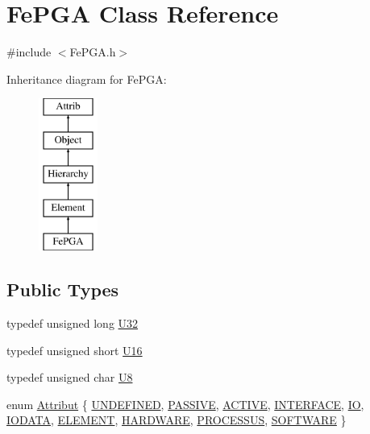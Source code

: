 \hypertarget{classFePGA}{}\section{Fe\+P\+GA Class Reference}
\label{classFePGA}


{\ttfamily \#include $<$Fe\+P\+G\+A.\+h$>$}

Inheritance diagram for Fe\+P\+GA\+:\begin{figure}[H]
\begin{center}
\leavevmode
\includegraphics[height=5.000000cm]{classFePGA}
\end{center}
\end{figure}
\subsection*{Public Types}
\begin{DoxyCompactItemize}
\item 
typedef unsigned long \hyperlink{classFePGA_a1d44a0b27d13179bb1dceb5ec6f4cc1f}{U32}
\item 
typedef unsigned short \hyperlink{classFePGA_ac84b20a342a6c963cba061c8bdc37651}{U16}
\item 
typedef unsigned char \hyperlink{classFePGA_ab65d84dbbc4b5711eb4d85d00c5abfa2}{U8}
\item 
enum \hyperlink{classAttrib_a69e171d7cc6417835a5a306d3c764235}{Attribut} \{ \newline
\hyperlink{classAttrib_a69e171d7cc6417835a5a306d3c764235a3a8da2ab97dda18aebab196fe4100531}{U\+N\+D\+E\+F\+I\+N\+ED}, 
\hyperlink{classAttrib_a69e171d7cc6417835a5a306d3c764235a2bfb2af57b87031d190a05fe25dd92ed}{P\+A\+S\+S\+I\+VE}, 
\hyperlink{classAttrib_a69e171d7cc6417835a5a306d3c764235a3b1fec929c0370d1436f2f06e298fb0d}{A\+C\+T\+I\+VE}, 
\hyperlink{classAttrib_a69e171d7cc6417835a5a306d3c764235aa27c16b480a369ea4d18b07b2516bbc7}{I\+N\+T\+E\+R\+F\+A\+CE}, 
\newline
\hyperlink{classAttrib_a69e171d7cc6417835a5a306d3c764235a1420a5b8c0540b2af210b6975eded7f9}{IO}, 
\hyperlink{classAttrib_a69e171d7cc6417835a5a306d3c764235a0af3b0d0ac323c1704e6c69cf90add28}{I\+O\+D\+A\+TA}, 
\hyperlink{classAttrib_a69e171d7cc6417835a5a306d3c764235a7788bc5dd333fd8ce18562b269c9dab1}{E\+L\+E\+M\+E\+NT}, 
\hyperlink{classAttrib_a69e171d7cc6417835a5a306d3c764235a61ceb22149f365f1780d18f9d1459423}{H\+A\+R\+D\+W\+A\+RE}, 
\newline
\hyperlink{classAttrib_a69e171d7cc6417835a5a306d3c764235a75250e29692496e73effca2c0330977f}{P\+R\+O\+C\+E\+S\+S\+US}, 
\hyperlink{classAttrib_a69e171d7cc6417835a5a306d3c764235a103a67cd0b8f07ef478fa45d4356e27b}{S\+O\+F\+T\+W\+A\+RE}
 \}
\end{DoxyCompactItemize}

